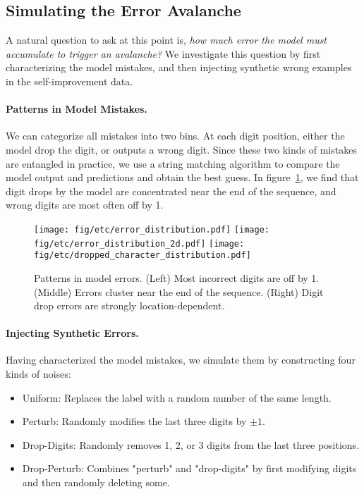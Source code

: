 \subsection{Simulating the Error Avalanche}
A natural question to ask at this point is,\textit{ how much error the model must accumulate to trigger an avalanche?} We investigate this question by first characterizing the model mistakes, and then injecting synthetic wrong examples in the self-improvement data.

\paragraph{Patterns in Model Mistakes.} 
We can categorize all mistakes into two bins. At each digit position, either the model drop the digit, or outputs a wrong digit. Since these two kinds of mistakes are entangled in practice, we use a string matching algorithm to compare the model output and predictions and obtain the best guess. In figure~\ref{fig:mistake_patterns}, we find that digit drops by the model are concentrated near the end of the sequence, and wrong digits are most often off by 1. 

\begin{figure}
    \centering
    \texttt{[image: fig/etc/error\_distribution.pdf]}
    \texttt{[image: fig/etc/error\_distribution\_2d.pdf]}
    \texttt{[image: fig/etc/dropped\_character\_distribution.pdf]}
    \caption{Patterns in model errors. (Left) Most incorrect digits are off by 1. (Middle) Errors cluster near the end of the sequence. (Right) Digit drop errors are strongly location-dependent.}
    \label{fig:mistake_patterns}
\end{figure}

\paragraph{Injecting Synthetic Errors.} 
Having characterized the model mistakes, we simulate them by constructing four kinds of noises:

\begin{itemize}
    \item Uniform: Replaces the label with a random number of the same length. 
    \item Perturb: Randomly modifies the last three digits by $\pm 1$.  
    \item Drop-Digits: Randomly removes 1, 2, or 3 digits from the last three positions. 
    \item Drop-Perturb: Combines "perturb" and "drop-digits" by first modifying digits and then randomly deleting some.
\end{itemize}


